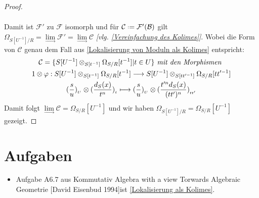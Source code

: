 \documentclass[10pt,a4paper]{report}
\newcommand{\comment}[1]{}
\newcommand{\ModulsOfDifferenzials}{Kommutativ Algebra with a view Torwards Algebraic Geometrie [David Eisenbud 1994]}
\newcommand{\functionfront}[3]{\nolinebreak{#1:#2 \longrightarrow #3}}
\newcommand{\divR}[2]{\Omega_{#1/#2}}
\newcommand{\divf}[1]{d_{#1}}
\newcommand{\Tensor}[3]{#1 \otimes_{#2} #3}
\newcommand{\tensor}[3]{#1 \otimes #3}
\newcommand{\lok}[2]{#1 [#2^{-1}]}
\newcommand{\loke}[3]{(\frac{#1}{#2})_{_{#3}}}
\newcommand{\colimes}[0]{\lim\limits_{ \longrightarrow }}
\newcommand*{\defeq}{\mathrel{\vcenter{\baselineskip0.5ex \lineskiplimit0pt
                     \hbox{\scriptsize.}\hbox{\scriptsize.}}}%
                     =}
\begin{document}
\begin{proof}
\begin{gather*}
\end{gather*}
\comment{Damit haben wir einen zu $\mathcal{F}$ isomorphen Funktor gefunden:
\begin{gather*}
\functionfront{\mathcal{F'}}{\mathcal{B}}{(\lok{S}{U} - Module)}\\
\lok{S}{t} \longmapsto \Tensor{\lok{S}{U}}{\lok{S}{t}}{\lok{\divR{S}{R}}{t}}\\
\varphi \longmapsto \tensor{1}{\lok{S}{t}}{\varphi}
\end{gather*}}
Damit ist $\mathcal{F'}$ zu $\mathcal{F}$ isomorph und für $\mathcal{C} \defeq \mathcal{F'}(\mathcal{B})$ gilt $\divR{\lok{S}{U}}{R}  = \colimes{\mathcal{F'}} = \colimes{\mathcal{C}}$ \textit{[vlg. \cref{Vereinfachung des Kolimes}]}.
Wobei die Form von $\mathcal{C}$ genau dem Fall aus \cref{Lokalisierung von Moduln als Kolimes} entspricht:
\begin{gather*}
\comment{\divR{\lok{S}{U}}{R}  = \colimes{\mathcal{C}} \text{, wobei:} \\}
\mathcal{C} = \lbrace \Tensor{\lok{S}{U}}{\lok{S}{t}}{\lok{\divR{S}{R}}{t}} \vert t \in U \rbrace \textit{ mit den Morphismen }\\
\functionfront{\tensor{1}{\lok{S}{t}}{\varphi}}{\Tensor{\lok{S}{U}}{\lok{S}{t}}{\lok{\divR{S}{R}}{t}}}{\Tensor{\lok{S}{U}}{\lok{S}{tt'}}{\lok{\divR{S}{R}}{tt'}}} \\
\tensor{\loke{s}{u}{U}}{\lok{S}{t}}{\loke{\divf{S}(x)}{t^n}{t}} \longmapsto \tensor{\loke{s}{u}{U}}{\lok{S}{tt'}}{\loke{t'^n\divf{S}(x)}{(tt')^n}{tt'}}
\end{gather*}
Damit folgt $\colimes \mathcal{C} = \lok{\divR{S}{R}}{U}$ und wir haben $\divR{\lok{S}{U}}{R} = \lok{\divR{S}{R}}{U}$ gezeigt.
\end{proof}
\chapter{Aufgaben}
\begin{itemize}
\item Aufgabe A6.7 aus \ModulsOfDifferenzials ist \cref{Lokalisierung als Kolimes}.
\end{itemize}
\end{document}
